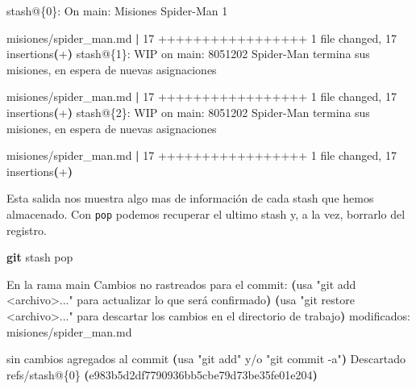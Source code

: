 \documentclass[
]{book}
\newenvironment{Shaded}{\begin{snugshade}}{\end{snugshade}}
\newcommand{\ErrorTok}[1]{\textcolor[rgb]{0.64,0.00,0.00}{\textbf{#1}}}
\newcommand{\ExtensionTok}[1]{#1}
\newcommand{\FunctionTok}[1]{\textcolor[rgb]{0.13,0.29,0.53}{\textbf{#1}}}
\newcommand{\KeywordTok}[1]{\textcolor[rgb]{0.13,0.29,0.53}{\textbf{#1}}}
\newcommand{\NormalTok}[1]{#1}
\newcommand{\StringTok}[1]{\textcolor[rgb]{0.31,0.60,0.02}{#1}}
\begin{document}
\begin{Shaded}
\begin{Highlighting}[]
\ExtensionTok{stash@\{0\}:}\NormalTok{ On main: Misiones Spider{-}Man 1}

 \ExtensionTok{misiones/spider\_man.md} \KeywordTok{|} \ExtensionTok{17}\NormalTok{ +++++++++++++++++}
 \ExtensionTok{1}\NormalTok{ file changed, 17 insertions}\ErrorTok{(}\ExtensionTok{+}\KeywordTok{)}
\ExtensionTok{stash@\{1\}:}\NormalTok{ WIP on main: 8051202 Spider{-}Man termina sus misiones, en espera de nuevas asignaciones}

 \ExtensionTok{misiones/spider\_man.md} \KeywordTok{|} \ExtensionTok{17}\NormalTok{ +++++++++++++++++}
 \ExtensionTok{1}\NormalTok{ file changed, 17 insertions}\ErrorTok{(}\ExtensionTok{+}\KeywordTok{)}
\ExtensionTok{stash@\{2\}:}\NormalTok{ WIP on main: 8051202 Spider{-}Man termina sus misiones, en espera de nuevas asignaciones}

 \ExtensionTok{misiones/spider\_man.md} \KeywordTok{|} \ExtensionTok{17}\NormalTok{ +++++++++++++++++}
 \ExtensionTok{1}\NormalTok{ file changed, 17 insertions}\ErrorTok{(}\ExtensionTok{+}\KeywordTok{)}
\end{Highlighting}
\end{Shaded}

Esta salida nos muestra algo mas de información de cada stash que hemos almacenado. Con \texttt{pop} podemos recuperar el ultimo stash y, a la vez, borrarlo del registro.

\begin{Shaded}
\begin{Highlighting}[]
\FunctionTok{git}\NormalTok{ stash pop}
\end{Highlighting}
\end{Shaded}

\begin{Shaded}
\begin{Highlighting}[]
\ExtensionTok{En}\NormalTok{ la rama main}
\ExtensionTok{Cambios}\NormalTok{ no rastreados para el commit:}
  \KeywordTok{(}\ExtensionTok{usa} \StringTok{"git add \textless{}archivo\textgreater{}..."}\NormalTok{ para actualizar lo que será confirmado}\KeywordTok{)}
  \KeywordTok{(}\ExtensionTok{usa} \StringTok{"git restore \textless{}archivo\textgreater{}..."}\NormalTok{ para descartar los cambios en el directorio de trabajo}\KeywordTok{)}
    \ExtensionTok{modificados:}\NormalTok{     misiones/spider\_man.md}

\ExtensionTok{sin}\NormalTok{ cambios agregados al commit }\ErrorTok{(}\ExtensionTok{usa} \StringTok{"git add"}\NormalTok{ y/o }\StringTok{"git commit {-}a"}\KeywordTok{)}
\ExtensionTok{Descartado}\NormalTok{ refs/stash@\{0\} }\ErrorTok{(}\ExtensionTok{e983b5d2df7790936bb5cbe79d73be35fe01e204}\KeywordTok{)}
\end{Highlighting}
\end{Shaded}
\end{document}
